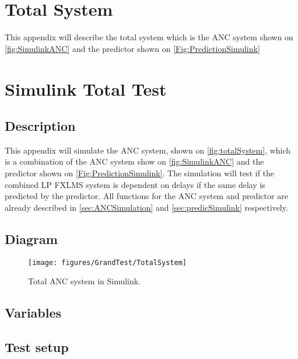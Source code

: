 \section{Total System} \label{sec:TotalSystem}
This appendix will describe the total system which is the ANC system shown on \autoref{fig:SimulinkANC} and the predictor shown on \autoref{Fig:PredictionSimulink} 


\section{Simulink Total Test} \label{sec:SimulinkTotalSystem}

\subsection{Description}
This appendix will simulate the ANC system, shown on \autoref{fig:totalSystem}, which is a combination of the ANC system show on \autoref{fig:SimulinkANC} and the predictor shown on \autoref{Fig:PredictionSimulink}. The simulation will test if the combined LP FXLMS system is dependent on delays if the same delay is predicted by the predictor. All functions for the ANC system and predictor are already described in \autoref{sec:ANCSimulation} and \autoref{sec:predicSimulink} respectively. 

\subsection{Diagram}
\begin{figure}[H]
	\centering
	\texttt{[image: figures/GrandTest/TotalSystem]}
	\caption{Total ANC system in Simulink.}
	\label{fig:totalSystem}
\end{figure}


\subsection{Variables}



\subsection{Test setup}

